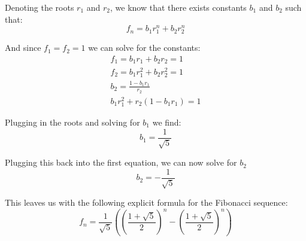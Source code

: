 \documentclass{article}
\begin{document}
Denoting the roots $r_1$ and $r_2$, we know that there exists constants $b_1$ and $b_2$ such that:
$$f_n=b_1r_1^n+b_2r_2^n$$

And since $f_1=f_2=1$ we can solve for the constants:
\begin{gather*}
  f_1=b_1r_1+b_2r_2=1\\
  f_2=b_1r_1^2+b_2r_2^2=1\\
  b_2=\frac{1-b_1r_1}{r_2}\\
  b_1r_1^2+r_2(1-b_1r_1)=1
\end{gather*}

Plugging in the roots and solving for $b_1$ we find:
$$b_1=\frac{1}{\sqrt 5}$$

Plugging this back into the first equation, we can now solve for $b_2$
$$b_2=-\frac{1}{\sqrt 5}$$

This leaves us with the following explicit formula for the Fibonacci sequence:
$$f_n=\frac{1}{\sqrt 5}\left(\left(\frac{1+\sqrt 5}{2}\right)^n-\left(\frac{1+\sqrt 5}{2}\right)^n\right)$$
\end{document}
